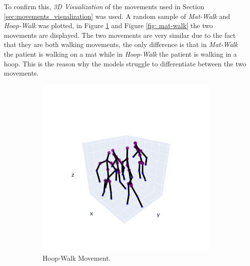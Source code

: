             \newpage

            To confirm this, \textit{3D Visualization} of the movements used in Section \ref{sec:movements_visualization} was used. A random sample of \textit{Mat-Walk} and \textit{Hoop-Walk} was plotted, in Figure \ref{fig: hoop-walk} and Figure \ref{fig: mat-walk} the two movements are displayed. The two movements are very similar due to the fact that they are both walking movements, the only difference is that in \textit{Mat-Walk} the patient is walking on a mat while in \textit{Hoop-Walk} the patient is walking in a hoop. This is the reason why the models struggle to differentiate between the two movements.

            \begin{figure}[h]
                \begin{subfigure}{.5\textwidth}
                \centering
                  \includegraphics[width=1.\linewidth]{../src/resources/mov-plots/mov-1.png}
                  \caption{Hoop-Walk Movement.}
                  \label{fig: hoop-walk}
                \end{subfigure}
                \begin{subfigure}{.5\textwidth}
                \centering

\end{subfigure}
\end{figure}
